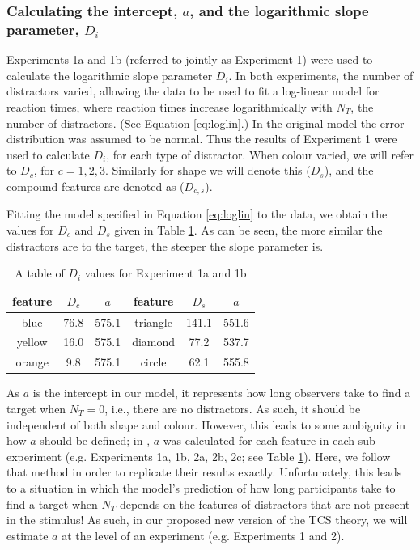 \documentclass[smallextended, natbib]{svjour3}       %
\begin{document}
\subsubsection{Calculating the intercept, $a$, and the logarithmic slope parameter, $D_i$}
\label{sec:fitting_D}

Experiments 1a and 1b (referred to jointly as Experiment 1) were used to calculate the logarithmic slope parameter $D_i$. In both experiments, the number of distractors varied, allowing the data to be used to fit a log-linear model for reaction times, where reaction times increase logarithmically with $N_T$, the number of distractors. (See Equation \ref{eq:loglin}.) In the original model the error distribution was assumed to be normal. Thus the results of Experiment 1 were used to calculate $D_i$, for each type of distractor. When colour varied, we will refer to $D_c$, for $c=1,2,3$. Similarly for shape we will denote this ($D_s$), and the compound features are denoted as ($D_{c,s}$). 

Fitting the model specified in Equation \ref{eq:loglin} to the data, we obtain the values for $D_c$ and $D_s$ given in Table \ref{tab:reimp_Dc_Ds}. As can be seen, the more similar the distractors are to the target, the steeper the slope parameter is. 

\begin{table}[h]
\centering
\begin{tabular}{ ccc|ccc } 
feature & $D_c$ & $a$ & feature & $D_s$ & $a$\\
 \hline 
blue & 76.8 & 575.1 & triangle & 141.1 & 551.6\\
yellow & 16.0 & 575.1 & diamond & 77.2 & 537.7\\
orange & 9.8 & 575.1 & circle & 62.1& 555.8\\
\end{tabular}
\caption{A table of $D_i$ values for Experiment 1a and 1b}
\label{tab:reimp_Dc_Ds}
\end{table}

As $a$ is the intercept in our model, it represents how long observers take to find a target when $N_T = 0$, i.e., there are no distractors. As such, it should be independent of both shape and colour. However, this leads to some ambiguity in how $a$ should be defined; in \cite{buetti2019predicting}, $a$ was calculated for each feature in each sub-experiment (e.g. Experiments 1a, 1b, 2a, 2b, 2c; see Table \ref{tab:reimp_Dc_Ds}). Here, we follow that method in order to replicate their results exactly. Unfortunately, this leads to a situation in which the model's prediction of how long participants take to find a target when $N_T$ depends on the features of distractors that are not present in the stimulus! As such, in our proposed new version of the TCS theory, we will estimate $a$ at the level of an experiment (e.g. Experiments 1 and 2).
\end{document}
